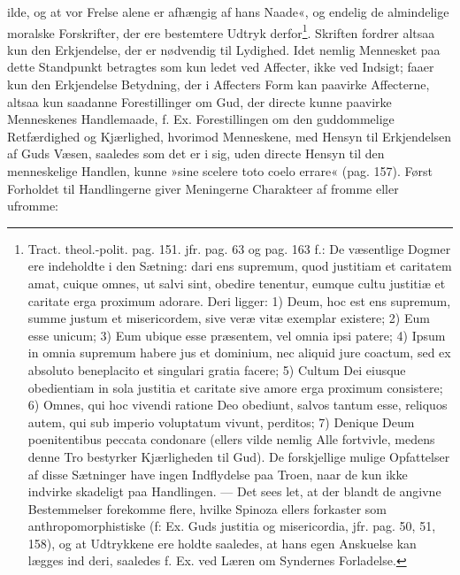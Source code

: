 \documentclass[12pt,a4paper]{book}
\begin{document}
ilde, og at vor Frelse alene er afhængig af hans Naade«, og endelig de almindelige moralske Forskrifter, der ere bestemtere Udtryk derfor\footnote{Tract. theol.-polit. pag. 151. jfr. pag. 63 og pag. 163 f.: De væsentlige Dogmer ere indeholdte i den Sætning: dari ens supremum, quod justitiam et caritatem amat, cuique omnes, ut salvi sint, obedire tenentur, eumque cultu justitiæ et caritate erga proximum adorare. Deri ligger: 1) Deum, hoc est ens supremum, summe justum et misericordem, sive veræ vitæ exemplar existere; 2) Eum esse unicum; 3) Eum ubique esse præsentem, vel omnia ipsi patere; 4) Ipsum in omnia supremum habere jus et dominium, nec aliquid jure coactum, sed ex absoluto beneplacito et singulari gratia facere; 5) Cultum Dei eiusque obedientiam in sola justitia et caritate sive amore erga proximum consistere; 6) Omnes, qui hoc vivendi ratione Deo obediunt, salvos tantum esse, reliquos autem, qui sub imperio voluptatum vivunt, perditos; 7) Denique Deum poenitentibus peccata condonare (ellers vilde nemlig Alle fortvivle, medens denne Tro bestyrker Kjærligheden til Gud). De forskjellige mulige Opfattelser af disse Sætninger have ingen Indflydelse paa Troen, naar de kun ikke indvirke skadeligt paa Handlingen. --- Det sees let, at der blandt de angivne Bestemmelser forekomme flere, hvilke Spinoza ellers forkaster
som anthropomorphistiske (f: Ex. Guds justitia og misericordia, jfr. pag. 50, 51, 158), og at Udtrykkene ere holdte saaledes, at hans egen Anskuelse kan lægges ind deri, saaledes f. Ex. ved Læren om Syndernes Forladelse.}. Skriften fordrer altsaa kun den Erkjendelse, der er nødvendig til Lydighed. Idet nemlig Mennesket paa dette Standpunkt betragtes som kun ledet ved Affecter, ikke ved Indsigt; faaer kun den Erkjendelse Betydning, der i Affecters Form kan paavirke Affecterne, altsaa kun saadanne Forestillinger om Gud, der directe kunne paavirke Menneskenes Handlemaade, f. Ex. Forestillingen om den guddommelige Retfærdighed og Kjærlighed, hvorimod Menneskene, med Hensyn til Erkjendelsen af Guds Væsen, saaledes som det er i sig, uden directe Hensyn til den menneskelige Handlen, kunne »sine scelere toto coelo errare« (pag. 157). Først Forholdet til Handlingerne giver Meningerne Charakteer af fromme eller ufromme:
\end{document}
